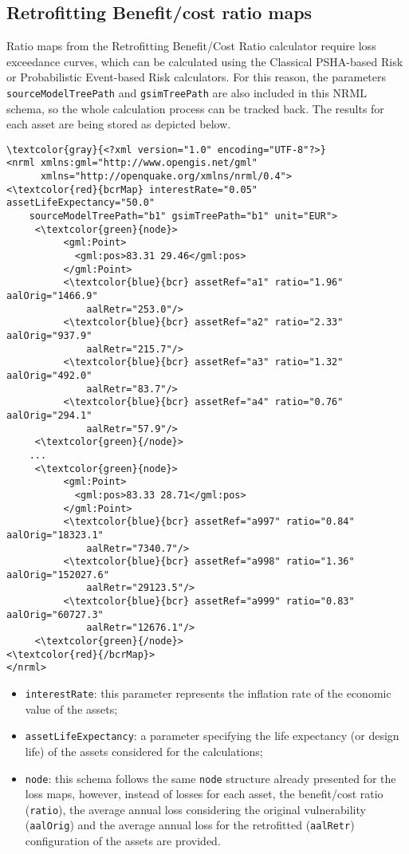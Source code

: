 \subsection{Retrofitting Benefit/cost ratio maps}
Ratio maps from the Retrofitting Benefit/Cost Ratio calculator require loss exceedance curves, which can be calculated using the Classical PSHA-based Risk or Probabilistic Event-based Risk calculators. For this reason, the parameters \Verb+sourceModelTreePath+ and \Verb+gsimTreePath+ are also included in this NRML schema, so the whole calculation process can be tracked back. The results for each \gls{asset} are being stored as depicted below.

\begin{Verbatim}[frame=single, commandchars=\\\{\}, samepage=false]
\textcolor{gray}{<?xml version="1.0" encoding="UTF-8"?>}
<nrml xmlns:gml="http://www.opengis.net/gml"
      xmlns="http://openquake.org/xmlns/nrml/0.4">
<\textcolor{red}{bcrMap} interestRate="0.05" assetLifeExpectancy="50.0"
    sourceModelTreePath="b1" gsimTreePath="b1" unit="EUR">
     <\textcolor{green}{node}>
          <gml:Point>
            <gml:pos>83.31 29.46</gml:pos>
          </gml:Point>
          <\textcolor{blue}{bcr} assetRef="a1" ratio="1.96" aalOrig="1466.9"
              aalRetr="253.0"/>
          <\textcolor{blue}{bcr} assetRef="a2" ratio="2.33" aalOrig="937.9"
              aalRetr="215.7"/>
          <\textcolor{blue}{bcr} assetRef="a3" ratio="1.32" aalOrig="492.0"
              aalRetr="83.7"/>
          <\textcolor{blue}{bcr} assetRef="a4" ratio="0.76" aalOrig="294.1"
              aalRetr="57.9"/>
     <\textcolor{green}{/node}>
    ...
     <\textcolor{green}{node}>
          <gml:Point>
            <gml:pos>83.33 28.71</gml:pos>
          </gml:Point>
          <\textcolor{blue}{bcr} assetRef="a997" ratio="0.84" aalOrig="18323.1"
              aalRetr="7340.7"/>
          <\textcolor{blue}{bcr} assetRef="a998" ratio="1.36" aalOrig="152027.6"
              aalRetr="29123.5"/>
          <\textcolor{blue}{bcr} assetRef="a999" ratio="0.83" aalOrig="60727.3"
              aalRetr="12676.1"/>
     <\textcolor{green}{/node}>
<\textcolor{red}{/bcrMap}>
</nrml>
\end{Verbatim}

\begin{itemize}
\item  \Verb+interestRate+: this parameter represents the inflation rate of the economic value of the \glspl{asset};
\item  \Verb+assetLifeExpectancy+: a parameter specifying the life expectancy (or design life) of the \glspl{asset} considered for the calculations;
\item  \Verb+node+: this schema follows the same \Verb+node+ structure already presented for the loss maps, however, instead of losses for each \gls{asset}, the benefit/cost ratio (\Verb+ratio+), the average annual loss considering the original vulnerability (\Verb+aalOrig+) and the average annual loss for the retrofitted (\Verb+aalRetr+) configuration  of the \glspl{asset} are provided.
\end{itemize}

